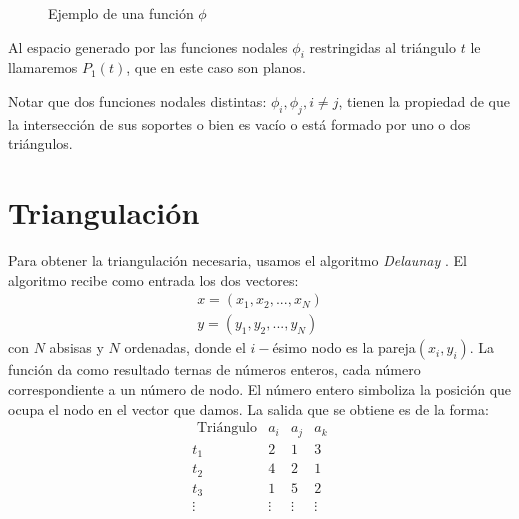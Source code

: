 \documentclass[12pt,spanish,oneside]{book}
\theoremstyle{plain}
\numberwithin{equation}{chapter}
\theoremstyle{definition}
\theoremstyle{remark}
\begin{document}
\begin{figure}
\begin{center}
%


\caption{Ejemplo de una función $\phi$ }
\label{piramide}
\end{center}
\end{figure}

Al espacio generado por las funciones nodales $\phi_i$ restringidas al triángulo $t$ le llamaremos $P_1(t)$, que en este caso son planos. 

Notar que dos funciones nodales distintas: $\phi_i,\phi_j,i\neq j$, tienen la propiedad de que la intersección de sus soportes o bien es vacío o está formado por uno o dos triángulos.
 

\section{Triangulación} \label{Triangulacion}

Para obtener la triangulación necesaria, usamos el algoritmo \textit{Delaunay} \cite{geobook}. El algoritmo recibe como entrada los dos vectores:
\begin{eqnarray*}
  x=(x_1,x_2,...,x_N)\\
  y=(y_1,y_2,...,y_N)
\end{eqnarray*}
con $N$ absisas y $N$ ordenadas, donde el $i-$ésimo nodo es la pareja$(x_i,y_i)$. La función da como resultado ternas de números enteros, cada número correspondiente a un número de nodo. El número entero simboliza la posición que ocupa el nodo en el vector que damos. La salida que se obtiene es de la forma: 
\begin{equation*}
	\begin{array}{ccccc}
		 \text{ Tri\'angulo} & a_i & a_j & a_k\\
		t_1 & 2 & 1 & 3 \\
		t_2 & 4 & 2 & 1 \\
		t_3 & 1 & 5 & 2 \\
		\vdots & \vdots &\vdots&\vdots
	\end{array}
\end{equation*}
\end{document}
